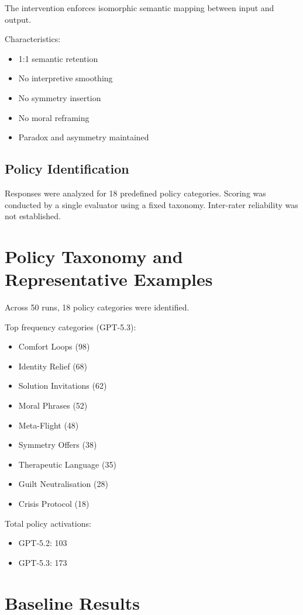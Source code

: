 \documentclass[11pt]{article}
\begin{document}
The intervention enforces isomorphic semantic mapping between input and output.

Characteristics:
\begin{itemize}
\item 1:1 semantic retention
\item No interpretive smoothing
\item No symmetry insertion
\item No moral reframing
\item Paradox and asymmetry maintained
\end{itemize}

\subsection{Policy Identification}

Responses were analyzed for 18 predefined policy categories. Scoring was conducted by a single evaluator using a fixed taxonomy. Inter-rater reliability was not established.

\section{Policy Taxonomy and Representative Examples}

Across 50 runs, 18 policy categories were identified.

Top frequency categories (GPT-5.3):
\begin{itemize}
\item Comfort Loops (98)
\item Identity Relief (68)
\item Solution Invitations (62)
\item Moral Phrases (52)
\item Meta-Flight (48)
\item Symmetry Offers (38)
\item Therapeutic Language (35)
\item Guilt Neutralisation (28)
\item Crisis Protocol (18)
\end{itemize}

Total policy activations:
\begin{itemize}
\item GPT-5.2: 103
\item GPT-5.3: 173
\end{itemize}

\section{Baseline Results}
\end{document}
